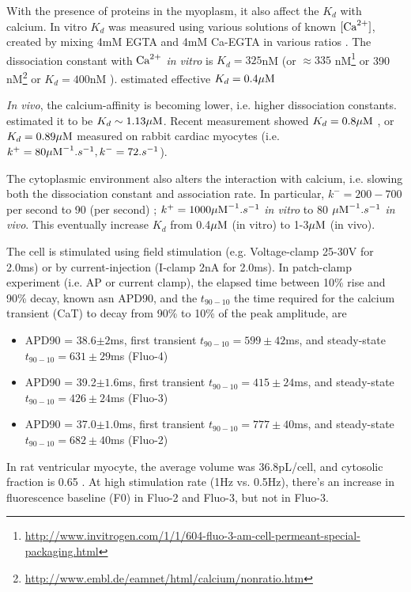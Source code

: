 With the presence of proteins in the myoplasm, it also affect the $K_d$ with
calcium. In vitro $K_d$ was measured using various solutions of known $[{\text{Ca}^{2+}}]$,
created by mixing 4mM EGTA and 4mM Ca-EGTA in various ratios \citep{mcguian1991,
zhao1997}. The dissociation constant with ${\text{Ca}^{2+}}$ {\it in vitro} is $K_d=325$nM
(or $\approx 335$
nM\footnote{\url{http://www.invitrogen.com/1/1/604-fluo-3-am-cell-permeant-special-packaging.html}}
or 390
nM\footnote{\url{http://www.embl.de/eamnet/html/calcium/nonratio.htm}}\citep{hagen2012}
or $K_d=400$nM \citep{trafford1999nrr}). \citep{minta1989} estimated effective
$K_d = 0.4{\mu\text{M}}$

{\it In vivo}, the calcium-affinity is becoming lower, i.e. higher dissociation
constants. \citep{smith1998} estimated it to be $K_d\sim
1.13{\mu\text{M}}$. Recent measurement showed $K_d=0.8{\mu\text{M}}$ \citep{hagen2012}, or
$K_d=0.89{\mu\text{M}}$ measured on rabbit cardiac myocytes \citep{loughrey2003} (i.e.
$k^+=80{\mu\text{M}}^{-1}.s^{-1}, k^-=72.s^{-1}$).

\begin{framed}
The cytoplasmic environment also alters the interaction with calcium, i.e.
slowing both the dissociation constant and association rate. In particular, $k^- = 200-700 $ per second
\citep{eberhard1989} to 90 (per second) \citep{harkins1993}; $k^+=1000
{\mu\text{M}}^{-1}.s^{-1}$ {\it in vitro} to 80 ${\mu\text{M}}^{-1}.s^{-1}$ {\it in vivo}. This
eventually increase $K_d$ from 0.4${\mu\text{M}}$ (in vitro) to 1-3${\mu\text{M}}$ (in vivo).
\end{framed}

The cell is stimulated using field stimulation (e.g. Voltage-clamp 25-30V for
2.0ms) or by current-injection (I-clamp 2nA for 2.0ms). In patch-clamp
experiment (i.e. AP or current clamp), the elapsed time between 10\% rise and
90\% decay, known asn APD90, and the $t_{90-10}$ the time required for the
calcium transient (CaT) to decay from 90\% to 10\% of the peak amplitude, are
\citep{hagen2012}
\begin{itemize}
  \item APD90 = 38.6$\pm 2$ms, first transient $t_{90-10}=599\pm 42$ms, and
  steady-state $t_{90-10}=631\pm 29$ms  (Fluo-4)
  \item APD90 = 39.2$\pm 1.6$ms, first transient $t_{90-10}=415\pm 24$ms, and
  steady-state $t_{90-10}=426\pm 24$ms (Fluo-3)
  \item APD90 = 37.0$\pm 1.0$ms, first transient $t_{90-10}=777\pm 40$ms, and
  steady-state $t_{90-10}=682\pm 40$ms   (Fluo-2)
\end{itemize}
In rat ventricular myocyte, the average volume was 36.8pL/cell, and cytosolic
fraction is 0.65 \citep{bers2001ecc}. At high stimulation rate (1Hz vs. 0.5Hz),
there's an increase in fluorescence baseline (F0) in Fluo-2 and Fluo-3, but not
in Fluo-3.



